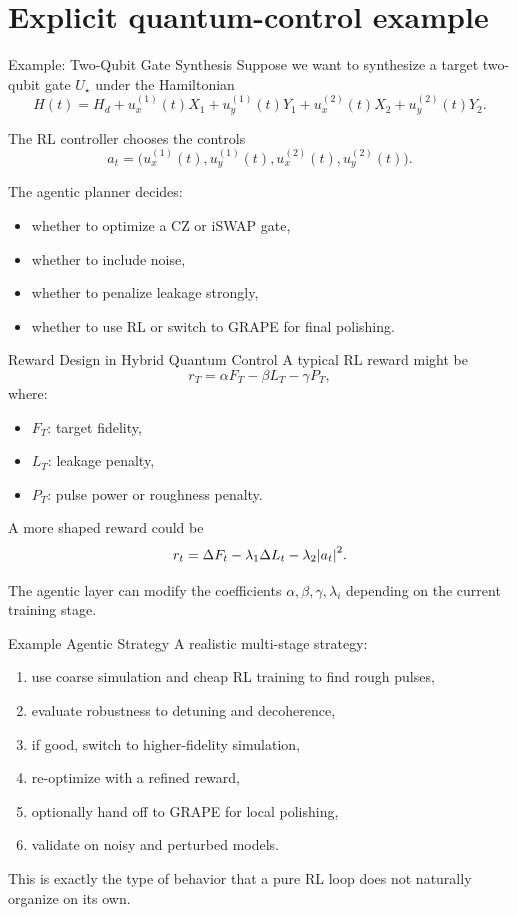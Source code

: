 \documentclass[aspectratio=169]{beamer}
\begin{document}
\section{Explicit quantum-control example}

\begin{frame}{Example: Two-Qubit Gate Synthesis}
Suppose we want to synthesize a target two-qubit gate \(U_\star\) under the Hamiltonian
\[
H(t)=H_d + u_x^{(1)}(t)X_1 + u_y^{(1)}(t)Y_1 + u_x^{(2)}(t)X_2 + u_y^{(2)}(t)Y_2.
\]

The RL controller chooses the controls
\[
a_t = \big(u_x^{(1)}(t),u_y^{(1)}(t),u_x^{(2)}(t),u_y^{(2)}(t)\big).
\]

The agentic planner decides:
\begin{itemize}
    \item whether to optimize a CZ or iSWAP gate,
    \item whether to include noise,
    \item whether to penalize leakage strongly,
    \item whether to use RL or switch to GRAPE for final polishing.
\end{itemize}
\end{frame}

\begin{frame}{Reward Design in Hybrid Quantum Control}
A typical RL reward might be
\[
r_T = \alpha F_T - \beta L_T - \gamma P_T,
\]
where:
\begin{itemize}
    \item \(F_T\): target fidelity,
    \item \(L_T\): leakage penalty,
    \item \(P_T\): pulse power or roughness penalty.
\end{itemize}

A more shaped reward could be
\[
r_t = \Delta F_t - \lambda_1 \Delta L_t - \lambda_2 \abs{a_t}^2.
\]

The agentic layer can modify the coefficients \(\alpha,\beta,\gamma,\lambda_i\) depending on the current training stage.
\end{frame}

\begin{frame}{Example Agentic Strategy}
A realistic multi-stage strategy:
\begin{enumerate}
    \item use coarse simulation and cheap RL training to find rough pulses,
    \item evaluate robustness to detuning and decoherence,
    \item if good, switch to higher-fidelity simulation,
    \item re-optimize with a refined reward,
    \item optionally hand off to GRAPE for local polishing,
    \item validate on noisy and perturbed models.
\end{enumerate}

This is exactly the type of behavior that a pure RL loop does not naturally organize on its own.
\end{frame}
\end{document}

